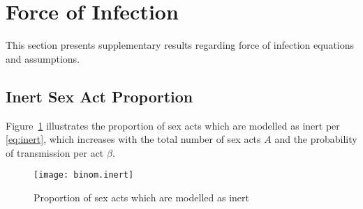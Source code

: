 \section{Force of Infection}\label{sr.foi}
This section presents supplementary results regarding
force of infection equations and assumptions.
\subsection{Inert Sex Act Proportion}\label{sr.foi.inert}
Figure~\ref{fig:binom.inert} illustrates
the proportion of sex acts which are modelled as inert per \eqref{eq:inert}, which increases with
the total number of sex acts $A$ and
the probability of transmission per act $\beta$.
\begin{figure}[h]
  \centering\texttt{[image: binom.inert]}
  \caption{Proportion of sex acts which are modelled as inert}
    \label{fig:binom.inert}
\end{figure}
